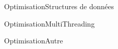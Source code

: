 \begin{frame}{Optimisation}{Structures de données}

\end{frame}

\begin{frame}{Optimisation}{MultiThreading}

\end{frame}

\begin{frame}{Optimisation}{Autre}

\end{frame}